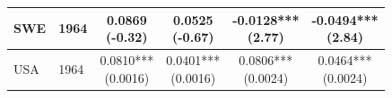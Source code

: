 \begin{tabular}{llcccc}
 SWE & 1964 & \makecell{0.0869 \\ (-0.32)} & \makecell{0.0525 \\ (-0.67)} & \makecell{-0.0128*** \\ (2.77)} & \makecell{-0.0494*** \\ (2.84)} \\ 
\midrule
 USA & 1964 & \makecell{0.0810*** \\ (0.0016)} & \makecell{0.0401*** \\ (0.0016)} & \makecell{0.0806*** \\ (0.0024)} & \makecell{0.0464*** \\ (0.0024)} \\ 
\bottomrule
\end{tabular}
